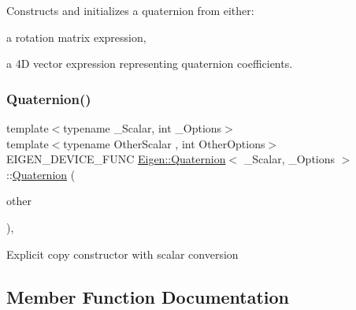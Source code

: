 Constructs and initializes a quaternion from either\+:
\begin{DoxyItemize}
\item a rotation matrix expression,
\item a 4D vector expression representing quaternion coefficients. 
\end{DoxyItemize}\mbox{\label{class_eigen_1_1_quaternion_af6430466427b40d7ed79bfb6818cccc2}} 
\subsubsection{\texorpdfstring{Quaternion()}{Quaternion()}\hspace{0.1cm}{\footnotesize\ttfamily [7/7]}}
{\footnotesize\ttfamily template$<$typename \+\_\+\+Scalar, int \+\_\+\+Options$>$ \\
template$<$typename Other\+Scalar , int Other\+Options$>$ \\
E\+I\+G\+E\+N\+\_\+\+D\+E\+V\+I\+C\+E\+\_\+\+F\+U\+NC \mbox{\hyperlink{class_eigen_1_1_quaternion}{Eigen\+::\+Quaternion}}$<$ \+\_\+\+Scalar, \+\_\+\+Options $>$\+::\mbox{\hyperlink{class_eigen_1_1_quaternion}{Quaternion}} (\begin{DoxyParamCaption}\item[{const \mbox{\hyperlink{class_eigen_1_1_quaternion}{Quaternion}}$<$ Other\+Scalar, Other\+Options $>$ \&}]{other }\end{DoxyParamCaption})\hspace{0.3cm}{\ttfamily [inline]}, {\ttfamily [explicit]}}

Explicit copy constructor with scalar conversion 

\subsection{Member Function Documentation}
\mbox{\label{class_eigen_1_1_quaternion_ab37b697ccf83573b0fd414e2ec543739}} 
